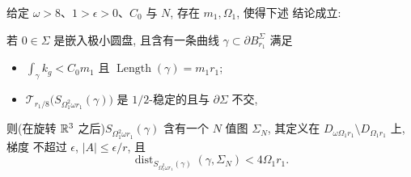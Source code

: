 \begin{proposition}
\label{prop:8.8}
给定 $\omega>8$、$1>\epsilon>0$、$C_0$ 与 $N$, 存在 $m_1,\Omega_1$, 使得下述
结论成立:

若 $0\in\Sigma$ 是嵌入极小圆盘, 且含有一条曲线
$\gamma\subset\partial B_{r_1}^\Sigma$ 满足

\begin{itemize}
\item $\displaystyle\int_\gamma k_g<C_0m_1$ 且
$\operatorname{Length}(\gamma)=m_1r_1$;
\item $\mathcal{T}_{r_1/8}\bigl(S_{\Omega_1^2\omega r_1}(\gamma)\bigr)$ 是
$1/2$-稳定的且与 $\partial\Sigma$ 不交,
\end{itemize}

则(在旋转 $\mathbb{R}^3$ 之后)$S_{\Omega_1^2\omega r_1}(\gamma)$ 含有一个 $N$ 值图
$\Sigma_N$, 其定义在 $D_{\omega\Omega_1r_1}\setminus D_{\Omega_1r_1}$ 上, 梯度
不超过 $\epsilon$, $|A|\leq\epsilon/r$, 且
\begin{equation}
\operatorname{dist}_{S_{\Omega_1^2\omega r_1}(\gamma)}(\gamma,\Sigma_N)
 <4\Omega_1r_1.
\label{eq:8.40}
\end{equation}
\end{proposition}


